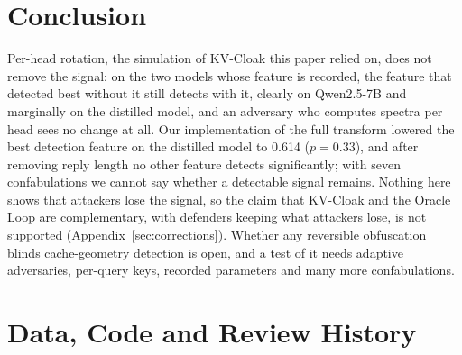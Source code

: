 \documentclass[11pt,a4paper]{article}
\begin{document}
\section{Conclusion}

Per-head rotation, the simulation of KV-Cloak this paper relied on, does
not remove the signal: on the two models whose feature is recorded, the
feature that detected best without it still detects with it, clearly on
Qwen2.5-7B and marginally on the distilled model, and an adversary who
computes spectra per head sees no change at all. Our implementation of
the full transform lowered the best detection feature on the distilled
model to 0.614 ($p = 0.33$), and after removing reply length no other feature detects
significantly; with seven confabulations we cannot say whether a
detectable signal remains. Nothing here shows that attackers lose the
signal, so the claim that KV-Cloak and the Oracle Loop are complementary,
with defenders keeping what attackers lose, is not supported
(Appendix~\ref{sec:corrections}). Whether any reversible
obfuscation blinds cache-geometry detection is open, and a test of it
needs adaptive adversaries, per-query keys, recorded parameters and many
more confabulations.

\section*{Data, Code and Review History}
\end{document}
